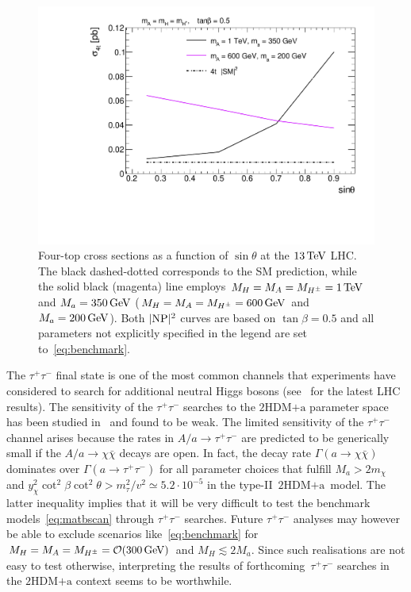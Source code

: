 \documentclass[a4paper, 11pt,notoc]{article}
\newcommand{\mA}{\ensuremath{M_{A}}\xspace}
\newcommand{\ma}{\ensuremath{M_{a}}\xspace}
\newcommand{\mH}{\ensuremath{M_{H}}\xspace}
\newcommand{\mHc}{\ensuremath{M_{H^{\pm}}}\xspace}
\newcommand{\hdma}{\ensuremath{\textrm{2HDM+a}}\xspace}
\begin{document}
\begin{figure}[t!]
\centering
\includegraphics[width=.625\textwidth]{plot_st.pdf}
\vspace{1mm}
\caption{\label{DMHF-4top-scan3} Four-top cross sections as a function of $\sin \theta$ at the $13 \, {\rm TeV}$ LHC. The black dashed-dotted corresponds to the SM prediction, while the solid black (magenta) line employs  $\mH =\mA=\mHc = 1 \, {\rm TeV}$ and $\ma = 350  \, {\rm GeV}$ ($\mH =\mA=\mHc = 600 \, {\rm GeV}$ and $\ma = 200 \, {\rm GeV}$). Both $|{\rm NP}|^2$ curves are based on $\tan \beta = 0.5$ and all parameters not explicitly specified in the legend are set to~\eqref{eq:benchmark}. }
\end{figure}

The $\tau^+ \tau^-$ final state is one of the most common channels that experiments have considered to search for additional neutral Higgs bosons (see~\cite{Aaboud:2017sjh,Sirunyan:2018zut} for the latest LHC results).   The sensitivity of the $\tau^+ \tau^-$ searches to the \hdma parameter space has been studied in~\cite{Bauer:2017ota} and found to be weak. The limited sensitivity of the $\tau^+ \tau^-$ channel arises because the rates in  $A/a \to \tau^+ \tau^-$  are predicted to be generically small if the $A/a \to \chi \bar \chi$ decays are open. In fact, the decay rate $\Gamma ( a \to \chi \bar \chi )$ dominates over  $\Gamma ( a \to \tau^+ \tau^- )$ for all parameter choices that fulfill $M_a > 2 m_\chi$ and  $y_\chi^2  \cot^2 \beta \cot^2 \theta > m_\tau^2/v^2 \simeq 5.2 \cdot 10^{-5}$ in the type-II~\hdma~model. The latter inequality implies that it will be very difficult to test the benchmark models~\eqref{eq:matbscan} through  $\tau^+ \tau^-$ searches. Future  $\tau^+ \tau^-$ analyses may however be able to exclude scenarios like~\eqref{eq:benchmark} for $\mH = \mA = \mHc = {\cal O} (300 \, {\rm GeV})$ and $M_H \lesssim 2M_a$. Since such realisations are not easy to test otherwise, interpreting the results of forthcoming~$\tau^+ \tau^-$ searches in the \hdma context seems to be worthwhile.
\end{document}
